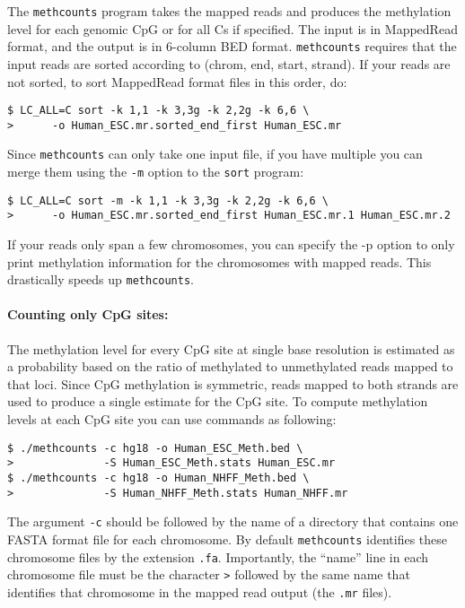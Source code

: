 \documentclass[10pt]{article}
\newcommand{\prog}[1]{\texttt{#1}}
\newcommand{\fn}[1]{\texttt{#1}}
\newcommand{\lit}[1]{\texttt{#1}}
\newcommand{\op}[1]{\texttt{#1}}
\begin{document}
The \prog{methcounts} program takes the mapped reads and produces the
methylation level for each genomic CpG or for all Cs if specified.
The input is in MappedRead format, and the output is in 6-column BED
format. \prog{methcounts} requires that the input reads are sorted
according to (chrom, end, start, strand). If your reads are not
sorted, to sort MappedRead format files in this order, do:
\begin{verbatim}
$ LC_ALL=C sort -k 1,1 -k 3,3g -k 2,2g -k 6,6 \
>      -o Human_ESC.mr.sorted_end_first Human_ESC.mr
\end{verbatim}
Since \prog{methcounts} can only take one input file, if you have
multiple you can merge them using the \op{-m} option to the
\prog{sort} program:
\begin{verbatim}
$ LC_ALL=C sort -m -k 1,1 -k 3,3g -k 2,2g -k 6,6 \
>      -o Human_ESC.mr.sorted_end_first Human_ESC.mr.1 Human_ESC.mr.2
\end{verbatim}

If your reads only span a few chromosomes, you can specify the -p option
to only print methylation information for the chromosomes with mapped reads.
This drastically speeds up \prog{methcounts}.

\paragraph{Counting only CpG sites:}
The methylation level for every CpG site at single base resolution is
estimated as a probability based on the ratio of methylated to
unmethylated reads mapped to that loci. Since CpG methylation is
symmetric, reads mapped to both strands are used to produce a single
estimate for the CpG site. To compute methylation levels at each CpG
site you can use commands as following:
\begin{verbatim}
$ ./methcounts -c hg18 -o Human_ESC_Meth.bed \
>              -S Human_ESC_Meth.stats Human_ESC.mr
$ ./methcounts -c hg18 -o Human_NHFF_Meth.bed \
>              -S Human_NHFF_Meth.stats Human_NHFF.mr
\end{verbatim}
The argument \op{-c} should be followed by the name of a directory
that contains one FASTA format file for each chromosome. By default
\prog{methcounts} identifies these chromosome files by the extension
\fn{.fa}. Importantly, the ``name'' line in each chromosome file must
be the character \lit{>} followed by the same name that identifies
that chromosome in the mapped read output (the \fn{.mr} files).
\end{document}
